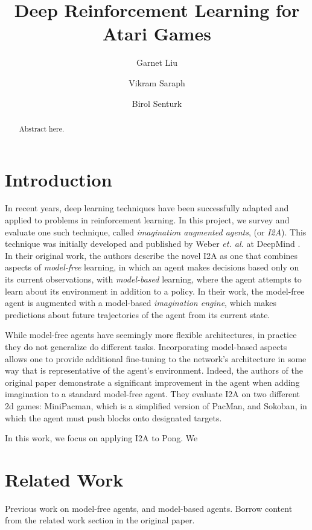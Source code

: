 \documentclass[10pt, twocolumn]{article}
\title{Deep Reinforcement Learning for Atari Games}
\author{Garnet Liu \and Vikram Saraph \and Birol Senturk}
\begin{document}
\maketitle

\begin{abstract}

Abstract here.

\end{abstract}

\section{Introduction}

In recent years, deep learning techniques have been successfully adapted and applied to problems
in reinforcement learning. In this project, we survey and evaluate one such technique, called \emph{imagination augmented agents},
(or \emph{I2A}). This technique was initially developed and published by Weber \emph{et. al.} at DeepMind \cite{}. In their original
work, the authors describe the novel I2A as one that combines aspects of \emph{model-free} learning, in which an agent makes decisions
based only on its current observations, with \emph{model-based} learning, where the agent attempts to learn about its environment
in addition to a policy. In their work, the model-free agent is augmented with a model-based \emph{imagination engine}, which
makes predictions about future trajectories of the agent from its current state.

While model-free agents have seemingly more flexible architectures, in practice they do not generalize do different tasks. Incorporating 
model-based aspects allows one to provide additional fine-tuning to the network's architecture in some way that is representative of the 
agent's environment. Indeed, the authors of the original paper demonstrate a significant improvement in the agent when adding 
imagination to a standard model-free agent. They evaluate I2A on two different 2d games: MiniPacman, which is a simplified version of 
PacMan, and Sokoban, in which the agent must push blocks onto designated targets.

In this work, we focus on applying I2A to Pong. We 

\section{Related Work}
Previous work on model-free agents, and model-based agents. Borrow content from the related work section in the original paper.
\end{document}
